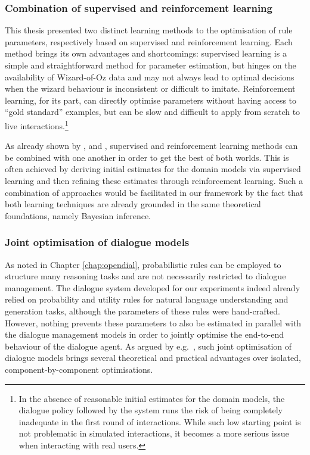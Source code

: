 \subsubsection*{Combination of supervised and reinforcement learning}

This thesis presented two distinct learning methods to the optimisation of rule parameters, respectively based on supervised and reinforcement learning.  Each method brings its own advantages and shortcomings: supervised learning is a simple and straightforward method for parameter estimation, but hinges on the availability of Wizard-of-Oz data and may not always lead to optimal decisions when the wizard behaviour is inconsistent or difficult to imitate.  Reinforcement learning, for its part, can directly optimise parameters without having access to ``gold standard'' examples, but can be slow and difficult to apply from scratch to live interactions.\footnote{In the absence of reasonable initial estimates for the domain models, the dialogue policy followed by the system runs the risk of being completely inadequate in the first round of interactions.  While such low starting point is not problematic in simulated interactions, it becomes a more serious issue when interacting with real users.} 

As already shown by \cite{williams2003}, \cite{rieser2006} and \cite{Henderson:2008}, supervised and reinforcement learning methods can be combined with one another in order to get the best of both worlds. This is often achieved by deriving initial estimates for the domain models via supervised learning and then refining these estimates through reinforcement learning. Such a combination of approaches would be facilitated in our framework by the fact that both learning techniques are already grounded in the same theoretical foundations, namely Bayesian inference. 

\subsubsection*{Joint optimisation of dialogue models}

As noted in Chapter \ref{chap:opendial}, probabilistic rules can be employed to structure many reasoning tasks and are not necessarily restricted to dialogue management. The dialogue system developed for our experiments indeed already relied on probability and utility rules for natural language understanding and generation tasks, although the parameters of these rules were hand-crafted. However, nothing prevents these parameters to also be estimated in parallel with the dialogue management models in order to jointly optimise the end-to-end behaviour of the dialogue agent.  As argued by e.g.\ \cite{Lemon:2011}, such joint optimisation of dialogue models brings several theoretical and practical advantages over isolated, component-by-component optimisations.

